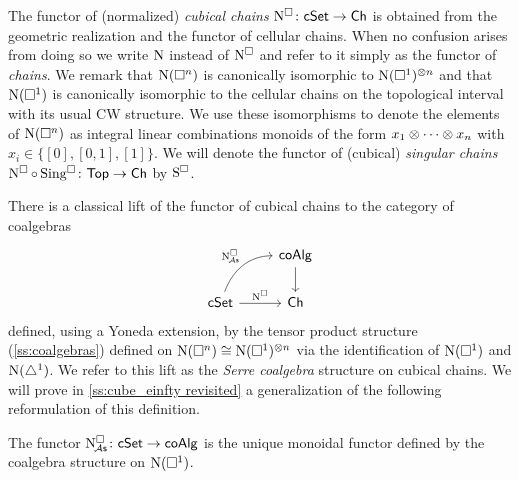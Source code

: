 The functor of (normalized) \textit{cubical chains} $\operatorname{N^{\square}} \colon \mathsf{cSet} \to \mathsf{Ch}$ is obtained from the geometric realization and the functor of cellular chains.
When no confusion arises from doing so we write $\operatorname{N}$ instead of $\operatorname{N^{\square}}$ and refer to it simply as the functor of \textit{chains}.
We remark that $\operatorname{N}(\square^n)$ is canonically isomorphic to $\operatorname{N}(\square^1)^{\otimes n}$ and that $\operatorname{N}(\square^1)$ is canonically isomorphic to the cellular chains on the topological interval with its usual CW structure.
We use these isomorphisms to denote the elements of $\operatorname{N}(\square^n)$ as integral linear combinations monoids of the form $x_1 \otimes\dotsb\otimes x_n$ with $x_i \in \big\{[0], [0,1], [1] \big\}$.
We will denote the functor of (cubical) \textit{singular chains} $\operatorname{N^{\square}} \circ \operatorname{Sing^{\square}} \colon \mathsf{Top} \to \mathsf{Ch}$ by $\operatorname{S^{\square}}$.

There is a classical lift of the functor of cubical chains to the category of coalgebras
\[
\begin{tikzcd}
	& \coAlg \arrow[d] \\
	\cSet \arrow[r, "\cchains"] \arrow[ur, "\cchainsA", out=70, in=180] & \Ch
\end{tikzcd}
\]
defined, using a Yoneda extension, by the tensor product structure (\cref{ss:coalgebras}) defined on $\operatorname{N}(\square^n) \cong \operatorname{N}(\square^1)^{\otimes n}$ via the identification of $\operatorname{N}(\square^1)$ and $\operatorname{N}(\triangle^1)$.
We refer to this lift as the \textit{Serre coalgebra} structure on cubical chains.
We will prove in \cref{ss:cube_einfty revisited} a generalization of the following reformulation of this definition.
\begin{proposition}\label{p:serre coalgebra}
	The functor $\operatorname{N^{\square}_{\!{\mathcal{A}\mathsf{s}}}} \colon \mathsf{cSet} \to \mathsf{coAlg}$ is the unique monoidal functor defined by the coalgebra structure on $\operatorname{N}(\square^1)$.
\end{proposition}

